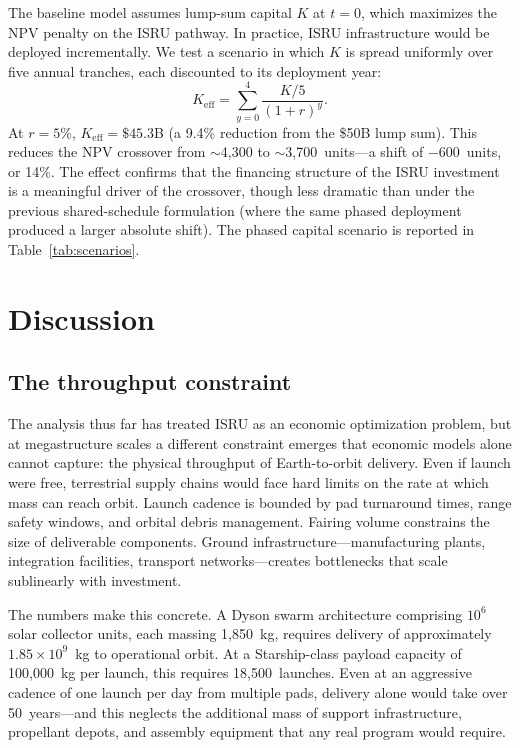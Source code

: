 \documentclass[preprint,12pt]{elsarticle}
\begin{document}
The baseline model assumes lump-sum capital $K$ at $t = 0$, which maximizes the NPV penalty on the ISRU pathway. In practice, ISRU infrastructure would be deployed incrementally. We test a scenario in which $K$ is spread uniformly over five annual tranches, each discounted to its deployment year:
\begin{equation}
  K_{\mathrm{eff}} = \sum_{y=0}^{4} \frac{K/5}{(1+r)^y}.
  \label{eq:phased_capital}
\end{equation}
At $r = 5\%$, $K_{\mathrm{eff}} = \$45.3$B (a 9.4\% reduction from the \$50B lump sum). This reduces the NPV crossover from $\sim$4{,}300 to $\sim$3{,}700~units---a shift of $-$600~units, or 14\%. The effect confirms that the financing structure of the ISRU investment is a meaningful driver of the crossover, though less dramatic than under the previous shared-schedule formulation (where the same phased deployment produced a larger absolute shift). The phased capital scenario is reported in Table~\ref{tab:scenarios}.

\section{Discussion}
\label{sec:discussion}

\subsection{The throughput constraint}

The analysis thus far has treated ISRU as an economic optimization problem, but at megastructure scales a different constraint emerges that economic models alone cannot capture: the physical throughput of Earth-to-orbit delivery. Even if launch were free, terrestrial supply chains would face hard limits on the rate at which mass can reach orbit. Launch cadence is bounded by pad turnaround times, range safety windows, and orbital debris management. Fairing volume constrains the size of deliverable components. Ground infrastructure---manufacturing plants, integration facilities, transport networks---creates bottlenecks that scale sublinearly with investment.

The numbers make this concrete. A Dyson swarm architecture comprising $10^6$ solar collector units, each massing 1{,}850~kg, requires delivery of approximately $1.85 \times 10^9$~kg to operational orbit. At a Starship-class payload capacity of 100{,}000~kg per launch, this requires 18{,}500~launches. Even at an aggressive cadence of one launch per day from multiple pads, delivery alone would take over 50~years---and this neglects the additional mass of support infrastructure, propellant depots, and assembly equipment that any real program would require.
\end{document}
